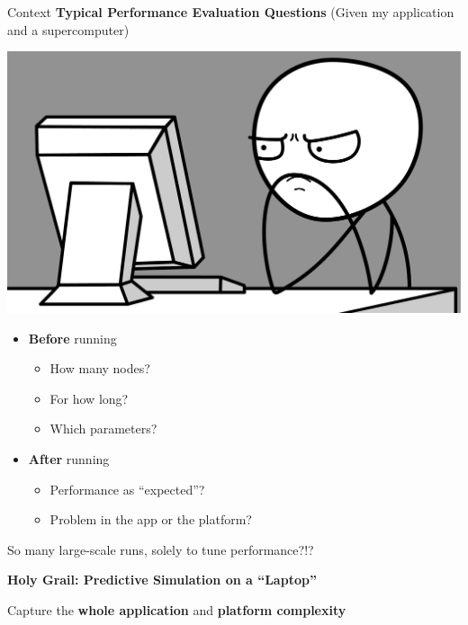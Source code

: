 \documentclass[10pt]{beamer}
\begin{document}
\begin{frame}{Context}
    \textbf{Typical Performance Evaluation Questions} (Given my application and a supercomputer)

    \begin{minipage}[m]{0.35\linewidth}
        \includegraphics[width=\textwidth]{img/slides/computer_guy_meme.pdf}
    \end{minipage} %
    \begin{minipage}[m]{0.64\linewidth}
    \begin{itemize}
        \item \textbf{Before} running
        \begin{itemize}
            \item How many nodes?
            \item For how long?
            \item Which parameters?
        \end{itemize}
        \pause
        \item \textbf{After} running
        \begin{itemize}
            \item Performance as ``expected''?
            \item Problem in the app or the platform?
        \end{itemize}
    \end{itemize}
    \end{minipage}
    \pause

    \begin{center}
        So many large-scale runs, solely to tune performance?!?
    \end{center}

    \pause

    \textbf{Holy Grail: Predictive Simulation on a ``Laptop''}

    Capture the \textbf{whole application}  and \textbf{platform complexity}
\end{frame}
\end{document}
